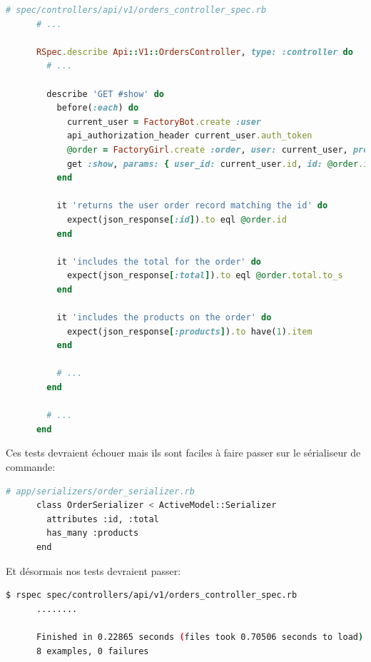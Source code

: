 \documentclass[]{report}
\begin{document}
    \begin{scriptsize}
      \begin{lstlisting}[language=ruby]
      # spec/controllers/api/v1/orders_controller_spec.rb
      # ...

      RSpec.describe Api::V1::OrdersController, type: :controller do
        # ...

        describe 'GET #show' do
          before(:each) do
            current_user = FactoryBot.create :user
            api_authorization_header current_user.auth_token
            @order = FactoryGirl.create :order, user: current_user, product_ids: [@product.id]
            get :show, params: { user_id: current_user.id, id: @order.id }
          end

          it 'returns the user order record matching the id' do
            expect(json_response[:id]).to eql @order.id
          end

          it 'includes the total for the order' do
            expect(json_response[:total]).to eql @order.total.to_s
          end

          it 'includes the products on the order' do
            expect(json_response[:products]).to have(1).item
          end

          # ...
        end

        # ...
      end
      \end{lstlisting}
    \end{scriptsize}

    Ces tests devraient échouer mais ils sont faciles à faire passer sur le sérialiseur de commande:

    \begin{scriptsize}
      \begin{lstlisting}[language=bash]
      # app/serializers/order_serializer.rb
      class OrderSerializer < ActiveModel::Serializer
        attributes :id, :total
        has_many :products
      end
      \end{lstlisting}
    \end{scriptsize}

    Et désormais nos tests devraient passer:

    \begin{scriptsize}
      \begin{lstlisting}[language=bash]
      $ rspec spec/controllers/api/v1/orders_controller_spec.rb
      ........

      Finished in 0.22865 seconds (files took 0.70506 seconds to load)
      8 examples, 0 failures
      \end{lstlisting}
    \end{scriptsize}
\end{document}

